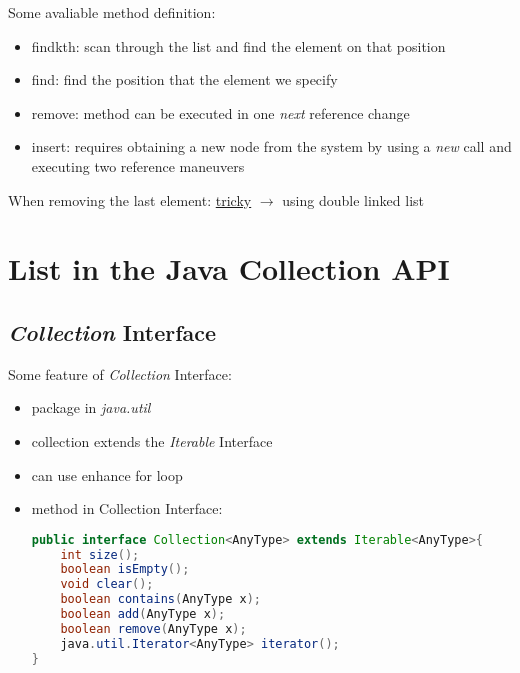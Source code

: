 \documentclass[12pt]{article}
\theoremstyle{definition}
\begin{document}
Some avaliable method definition:
\begin{itemize}
    \item findkth: scan through the list and find the element on that position
    \item find: find the position that the element we specify 
    \item remove: method can be executed in one \emph{next} reference change
    \item insert: requires obtaining a new node from the system by using a \emph{new} call
    and executing two reference maneuvers
\end{itemize}

When removing the last element: \underline{tricky} $\rightarrow$ using double linked list

\section{List in the Java Collection API}
\subsection{\emph{Collection} Interface}
Some feature of \emph{Collection} Interface:
\begin{itemize}
    \item package in \emph{java.util}
    \item collection extends the \emph{Iterable} Interface
    \item can use enhance for loop
    \item method in Collection Interface:
\begin{lstlisting}[language=Java]
public interface Collection<AnyType> extends Iterable<AnyType>{
    int size();
    boolean isEmpty();
    void clear();
    boolean contains(AnyType x);
    boolean add(AnyType x);
    boolean remove(AnyType x);
    java.util.Iterator<AnyType> iterator();
}
\end{lstlisting}
\end{itemize}
\end{document}
